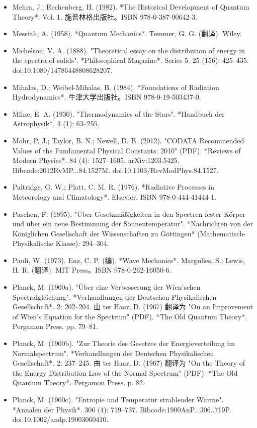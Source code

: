 \begin{itemize}
\item Mehra, J.; Rechenberg, H. (1982). *The Historical Development of Quantum Theory*. Vol. 1. 施普林格出版社。ISBN 978-0-387-90642-3.  
\item Messiah, A. (1958). *Quantum Mechanics*. Temmer, G. G. (翻译). Wiley.  
\item Michelson, V. A. (1888). "Theoretical essay on the distribution of energy in the spectra of solids". *Philosophical Magazine*. Series 5. 25 (156): 425–435. doi:10.1080/14786448808628207.  
\item Mihalas, D.; Weibel-Mihalas, B. (1984). *Foundations of Radiation Hydrodynamics*. 牛津大学出版社。ISBN 978-0-19-503437-0.  
\item Milne, E. A. (1930). "Thermodynamics of the Stars". *Handbuch der Astrophysik*. 3 (1): 63–255.  
\item Mohr, P. J.; Taylor, B. N.; Newell, D. B. (2012). "CODATA Recommended Values of the Fundamental Physical Constants: 2010" (PDF). *Reviews of Modern Physics*. 84 (4): 1527–1605. arXiv:1203.5425. Bibcode:2012RvMP...84.1527M. doi:10.1103/RevModPhys.84.1527.  
\item Paltridge, G. W.; Platt, C. M. R. (1976). *Radiative Processes in Meteorology and Climatology*. Elsevier. ISBN 978-0-444-41444-1.  
\item Paschen, F. (1895). "Über Gesetzmäßigkeiten in den Spectren fester Körper und über ein neue Bestimmung der Sonnentemperatur". *Nachrichten von der Königlichen Gesellschaft der Wissenschaften zu Göttingen* (Mathematisch-Physikalische Klasse): 294–304.  
\item Pauli, W. (1973). Enz, C. P. (编). *Wave Mechanics*. Margulies, S.; Lewis, H. R. (翻译). MIT Press。ISBN 978-0-262-16050-6.  
\item Planck, M. (1900a). "Über eine Verbesserung der Wien'schen Spectralgleichung". *Verhandlungen der Deutschen Physikalischen Gesellschaft*. 2: 202–204.  
  由 ter Haar, D. (1967) 翻译为 "On an Improvement of Wien's Equation for the Spectrum" (PDF). *The Old Quantum Theory*. Pergamon Press. pp. 79–81.  
\item Planck, M. (1900b). "Zur Theorie des Gesetzes der Energieverteilung im Normalspectrum". *Verhandlungen der Deutschen Physikalischen Gesellschaft*. 2: 237–245.  
  由 ter Haar, D. (1967) 翻译为 "On the Theory of the Energy Distribution Law of the Normal Spectrum" (PDF). *The Old Quantum Theory*. Pergamon Press. p. 82.  
\item Planck, M. (1900c). "Entropie und Temperatur strahlender Wärme". *Annalen der Physik*. 306 (4): 719–737. Bibcode:1900AnP...306..719P. doi:10.1002/andp.19003060410.  

\end{itemize}
